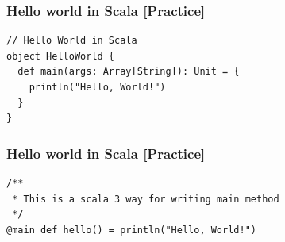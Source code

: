 \documentclass{beamer}
\begin{document}
\begin{frame}[fragile]
\frametitle{Hello world in Scala [Practice]}

\begin{lstlisting}[style=scalaStyle]
// Hello World in Scala
object HelloWorld {
  def main(args: Array[String]): Unit = {
    println("Hello, World!") 
  }
}
\end{lstlisting}

\end{frame}



\begin{frame}[fragile]
\frametitle{Hello world in Scala [Practice]}

\begin{lstlisting}[style=scalaStyle]
/**
 * This is a scala 3 way for writing main method
 */
@main def hello() = println("Hello, World!")
\end{lstlisting}

\end{frame}
\end{document}
